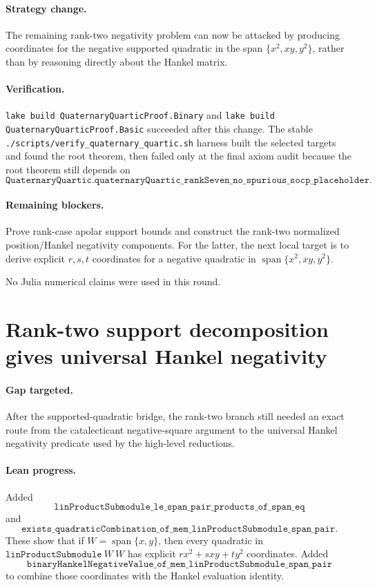 \documentclass[11pt]{article}
\begin{document}
\paragraph{Strategy change.}
The remaining rank-two negativity problem can now be attacked by producing
coordinates for the negative supported quadratic in the span
\(\{x^2,xy,y^2\}\), rather than by reasoning directly about the Hankel matrix.

\paragraph{Verification.}
\texttt{lake build QuaternaryQuarticProof.Binary} and
\texttt{lake build QuaternaryQuarticProof.Basic} succeeded after this change.
The stable \texttt{./scripts/verify\_quaternary\_quartic.sh} harness built the
selected targets and found the root theorem, then failed only at the final axiom
audit because the root theorem still depends on
\[
\texttt{QuaternaryQuartic.quaternaryQuartic\_rankSeven\_no\_spurious\_socp\_placeholder}.
\]

\paragraph{Remaining blockers.}
Prove rank-case apolar support bounds and construct the rank-two normalized
position/Hankel negativity components.  For the latter, the next local target is
to derive explicit \(r,s,t\) coordinates for a negative quadratic in
\(\operatorname{span}\{x^2,xy,y^2\}\).

No Julia numerical claims were used in this round.

\section*{Rank-two support decomposition gives universal Hankel negativity}

\paragraph{Gap targeted.}
After the supported-quadratic bridge, the rank-two branch still needed an exact
route from the catalecticant negative-square argument to the universal Hankel
negativity predicate used by the high-level reductions.

\paragraph{Lean progress.}
Added
\[
\texttt{linProductSubmodule\_le\_span\_pair\_products\_of\_span\_eq}
\]
and
\[
\texttt{exists\_quadraticCombination\_of\_mem\_linProductSubmodule\_span\_pair}.
\]
These show that if \(W=\operatorname{span}\{x,y\}\), then every quadratic in
\(\texttt{linProductSubmodule}\ W\ W\) has explicit
\(r x^2+sxy+t y^2\) coordinates.  Added
\[
\texttt{binaryHankelNegativeValue\_of\_mem\_linProductSubmodule\_span\_pair}
\]
to combine those coordinates with the Hankel evaluation identity.
\end{document}
